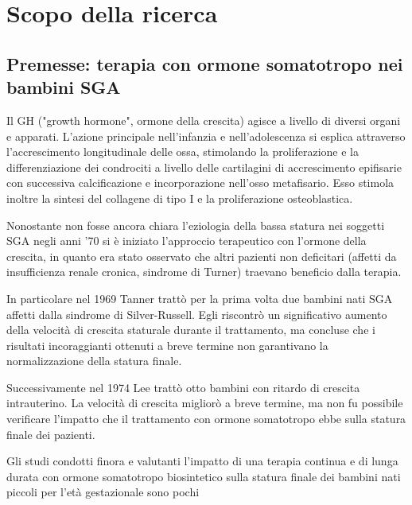  \chapter{Scopo della ricerca}

\section{Premesse: terapia con ormone somatotropo nei bambini SGA}


Il GH ("growth hormone", ormone della crescita) agisce a livello di diversi organi e apparati.
L'azione principale nell'infanzia e nell'adolescenza si esplica attraverso l'accrescimento
longitudinale delle ossa, stimolando la proliferazione e la differenziazione dei condrociti
a livello delle cartilagini di accrescimento epifisarie con successiva calcificazione
e incorporazione nell'osso metafisario. Esso stimola inoltre la sintesi del collagene 
di tipo I e la proliferazione osteoblastica.\cite{sga}


Nonostante non fosse ancora chiara l'eziologia della bassa statura nei soggetti SGA
negli anni '70 si è iniziato l'approccio terapeutico con l'ormone della crescita, in quanto era stato osservato che altri pazienti non deficitari (affetti da insufficienza renale cronica, sindrome di Turner) traevano beneficio dalla terapia.


In particolare nel 1969 Tanner trattò per la prima volta due bambini nati SGA affetti dalla sindrome di Silver-Russell. Egli riscontrò un significativo aumento della velocità di crescita staturale durante il trattamento, ma concluse che i risultati incoraggianti ottenuti a breve termine non garantivano la normalizzazione della statura finale.%


Successivamente nel 1974 Lee trattò otto bambini con ritardo di crescita intrauterino. La velocità di crescita migliorò a breve termine, ma non fu possibile verificare l'impatto che il trattamento con ormone somatotropo ebbe sulla statura finale dei pazienti.%


 Gli studi condotti finora e valutanti l'impatto di una terapia continua e di lunga durata 
con ormone somatotropo biosintetico sulla statura finale dei bambini nati piccoli per l'età gestazionale sono pochi 
 




